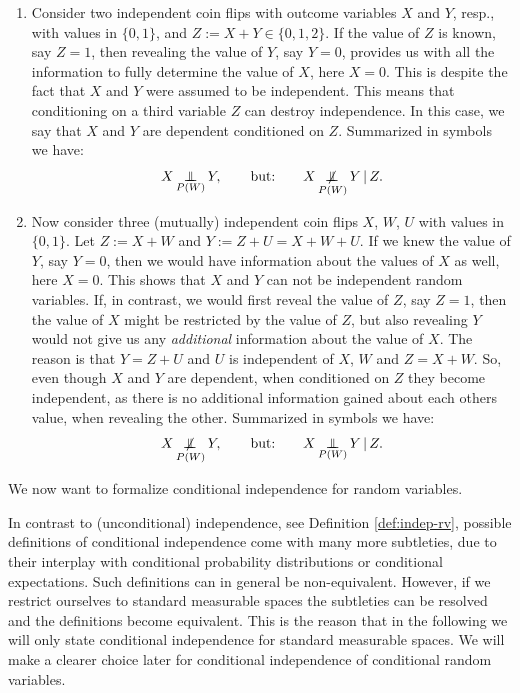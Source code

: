 \begin{Motivation}
    \begin{enumerate}
        \item Consider two independent coin flips with outcome variables $X$ and $Y$, resp., with values in $\{0,1\}$, and
    $Z:=X + Y \in \{0,1,2 \}$. If the value of $Z$ is known, say $Z=1$, then revealing the value of $Y$, say $Y=0$, provides us with all the information to fully determine the value of $X$, here $X=0$. This is despite the fact that $X$ and $Y$ were assumed to be independent. This means that conditioning on a third variable $Z$ can destroy independence. In this case, we say that $X$ and $Y$ are dependent conditioned on $Z$. Summarized in symbols we have:
    \[ X \operatorname*{\perp\mkern-11mu\perp}_{P(W)} Y, \qquad \text{but:} \qquad X \operatorname*{\not\mkern-2mu\perp\mkern-11mu\perp}_{P(W)} Y \operatorname*{|} Z.\]
\item Now consider three (mutually) independent coin flips $X$, $W$, $U$ with values in $\{0,1\}$.
    Let $Z:=X +W $ and $Y:=Z+U = X + W + U$. If we knew the value of $Y$, say $Y=0$, then we would have information about the values of $X$ as well, here $X=0$. This shows that $X$ and $Y$ can not be independent random variables.
    If, in contrast, we would first reveal the value of $Z$, say $Z=1$, then the value of $X$ might be restricted by the value of $Z$, but also revealing $Y$ would not give us any \emph{additional} information about the value of $X$. The reason is that $Y = Z + U$ and $U$ is independent of $X$, $W$ and $Z=X+W$. So, even though $X$ and $Y$ are dependent, when conditioned on $Z$ they become independent, as there is no additional information gained about each others value, when revealing the other. Summarized in symbols we have:
        \[ X \operatorname*{\not\mkern-2mu\perp\mkern-11mu\perp}_{P(W)} Y, \qquad \text{but:} \qquad X \operatorname*{\perp\mkern-11mu\perp}_{P(W)} Y \operatorname*{|} Z.\]
    \end{enumerate}
    We now want to formalize conditional independence for random variables.
\end{Motivation}

\begin{Rem}
    In contrast to (unconditional) independence, see Definition \ref{def:indep-rv}, possible definitions of conditional independence come with many more subtleties, due to their interplay with conditional probability distributions or conditional expectations. Such definitions can in general be non-equivalent. However, if we restrict ourselves to standard measurable spaces the subtleties can be resolved and the definitions become equivalent. 
    This is the reason that in the following we will only state conditional independence for standard measurable spaces.
    We will make a clearer choice later for conditional independence of conditional random variables.
\end{Rem}

